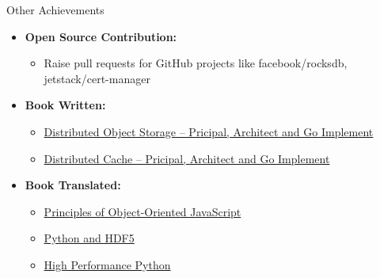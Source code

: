 \documentclass[11pt,oneside]{article}
\newenvironment{ressection}[1]{
	\vspace{4pt}
	{\selectfont\Large#1}
	\begin{itemize}
	\vspace{3pt}
}{
	\end{itemize}
}
\newcommand{\resitem}[1]{
	\vspace{-4pt}
	\item \begin{flushleft} #1 \end{flushleft}
}
\newcommand{\ressubitem}[1]{
	\vspace{-1pt}
	\item \begin{flushleft} #1 \end{flushleft}
}
\newenvironment{reslist}[1]{
	\resitem{\textbf{#1}}
	\vspace{-5pt}
	\begin{itemize}
}{
	\end{itemize}
}
\begin{document}
\begin{ressection}{Other Achievements}

	\begin{reslist}{Open Source Contribution:}
	        \ressubitem{Raise pull requests for GitHub projects like facebook/rocksdb, jetstack/cert-manager}
	\end{reslist}

	\begin{reslist}{Book Written:}
	        \ressubitem{\href{https://item.jd.com/60796801160.html}{Distributed Object Storage -- Pricipal, Architect and Go Implement}}
	        \ressubitem{\href{https://item.jd.com/12495484.html}{Distributed Cache -- Pricipal, Architect and Go Implement}}
	\end{reslist}

	\begin{reslist}{Book Translated:}
		\ressubitem{\href{https://www.epubit.com/book/detail/33175}{Principles of Object-Oriented JavaScript}}
		\ressubitem{\href{https://www.epubit.com/book/detail/15126}{Python and HDF5}}
		\ressubitem{\href{https://www.epubit.com/book/detail/14722}{High Performance Python}}
	\end{reslist}

\end{ressection}
\end{document}
